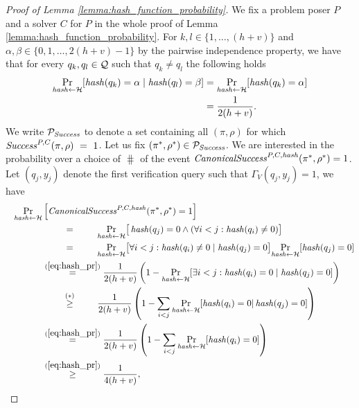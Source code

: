 \begin{proof}[Proof of Lemma \ref{lemma:hash_function_probability}]
We fix a problem poser $P$ and a solver $C$ for $P$ in the whole proof of Lemma \ref{lemma:hash_function_probability}.
For $k,l \in \{1, \dotsc, (h+v)\}$ and $\alpha,\beta \in \{0,1,\dotsc,2(h+v)-1\}$ by the pairwise independence property,
we have that for every $q_k, q_l \in \mathcal{Q}$ such that $q_k \neq q_l$ the following holds
\begin{align}
 \label{eq:hash_pr}
 \underset{\operatorname{\mathit{hash}} \leftarrow \mathcal{H}}{\Pr}[\operatorname{\mathit{hash}}(q_k) = \alpha \mid \operatorname{\mathit{hash}}(q_l) = \beta] &=
 \underset{\operatorname{\mathit{hash}} \leftarrow \mathcal{H}}{\Pr}[\operatorname{\mathit{hash}}(q_k) = \alpha] \notag\\ &= \frac{1}{2(h+v)}.
\end{align}
%
We write $\mathcal{P}_{\operatorname{\mathit{Success}}}$ to denote a set containing all $(\pi,\rho)$ for which $\operatorname{\mathit{Success}}^{P, C}(\pi, \rho)~=~1$.
Let us fix $(\pi^*, \rho^*) \in \mathcal{P}_{\mathit{Success}}$. We are interested in the probability over
a choice of $\hash$ of the event $\operatorname{\mathit{CanonicalSuccess}}^{P,C,\operatorname{\mathit{hash}}}(\pi^*, \rho^*) = 1$.
Let $(q_j, y_j)$ denote the first verification query such that $\Gamma_V(q_j, y_j) = 1$, we have
\begin{align}
  \label{ineq:prob_hash_success}
  \underset{\hash \leftarrow \cH}{\Pr}&\left[\CanonicalSuccess^{P,C,\hash}(\pi^*, \rho^*) = 1\right] \notag\\
  \IndII &\overset{\hphantom{\eqref{eq:hash_pr}}}{=} \underset{\hash \leftarrow \cH}{\Pr}\big[\hash(q_j) = 0 \land (\forall i < j : \hash(q_i) \neq 0)\big] \notag\\
  \IndII &\overset{\hphantom{\eqref{eq:hash_pr}}}{=} \underset{\hash \leftarrow \cH}{\Pr}\big[
  \forall i < j : \hash(q_i) \neq 0 \mid \hash(q_j) = 0\big] \underset{\hash \leftarrow \cH}{\Pr}[\hash(q_j) = 0] \notag\\
  \IndII &\overset{(\ref{eq:hash_pr})}{=} \frac{1}{2(h+v)}\left(1 -\underset{\hash \leftarrow \cH}{\Pr}[\exists i < j : \hash(q_i) = 0 \mid \hash(q_j) = 0] \right) \notag\\
  \IndII &\stackrel{\substack{\hphantom{\eqref{eq:hash_pr}}\\(*)}}{\geq} \frac{1}{2(h+v)} \left( 1 - \sum_{i < j} \underset{\hash \leftarrow \cH}{\Pr}[\hash(q_i) = 0 | \hash(q_j) = 0] \right) \notag\\
  \IndII &\stackrel{(\ref{eq:hash_pr})}{=} \frac{1}{2(h+v)} \left( 1 -  \sum_{i < j}\underset{\hash \leftarrow \cH}{\Pr}[\hash(q_i) = 0] \right) \notag\\
  \IndII &\overset{(\ref{eq:hash_pr})}{\geq} \frac{1}{4(h+v)},

\end{align}
\end{proof}
